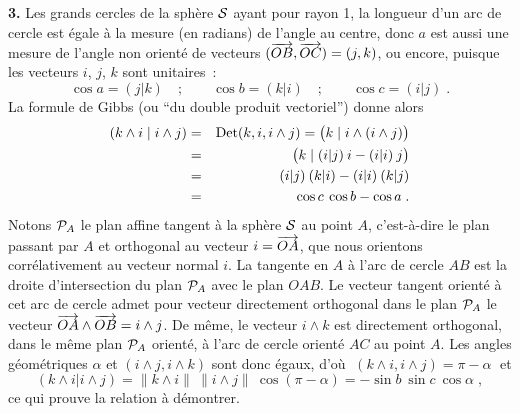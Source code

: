 \documentclass{article}
\begin{document}
{\bf 3.} Les grands cercles de la sph\`ere ${\cal S}$ ayant pour rayon 1, la longueur d'un arc de cercle est \'egale \`a la mesure (en radians) de l'angle au centre, donc $a$ est aussi une mesure de l'angle non orient\'e de vecteurs $(\vect{OB},\vect{OC})=(j,k)$, ou encore, puisque les vecteurs $i$, $j$, $k$ sont unitaires~:\vv
$$\cos a=(j|k)\quad;\qquad \cos b=(k|i)\quad ;\qquad\cos c=(i|j)\;.$$
La formule de Gibbs (ou ``du double produit vectoriel'') donne alors\vv
\begin{eqnarray*}
(k\wedge i\;|\;i\wedge j) & = & \mathop{\rm Det}\nolimits(k,i,i\wedge j)=\big(k\;|\;i\wedge(i\wedge j)\big)\\
& = & \big(k\;|\;(i|j)\>i-(i|i)\>j\big)\\
& = & (i|j)\>(k|i)-(i|i)\>(k|j)\\
& = & \cos c\>\cos b-\cos a\;.
\end{eqnarray*}
\sect
Notons ${\cal P}_A$ le plan affine tangent \`a la sph\`ere ${\cal S}$ au point $A$, c'est-\`a-dire le plan passant par $A$ et orthogonal au vecteur $i=\vect{OA}$, que nous orientons corr\'elativement au vecteur normal $i$. La tangente en $A$ \`a l'arc de cercle $AB$ est la droite d'intersection du plan ${\cal P}_A$ avec le plan $OAB$. Le vecteur tangent orient\'e \`a cet arc de cercle admet pour vecteur directement orthogonal dans le plan ${\cal P}_A$ le vecteur $\vect{OA}\wedge\vect{OB}=i\wedge j$. De m\^eme, le vecteur $i\wedge k$ est directement orthogonal, dans le m\^eme plan ${\cal P}_A$ orient\'e, \`a l'arc de cercle orient\'e $AC$ au point $A$. Les angles g\'eom\'etriques $\alpha$ et $(i\wedge j,i\wedge k)$ sont donc \'egaux, d'o\`u
$\;(k\wedge i,i\wedge j)=\pi-\alpha\;$ et\vv
$$(k\wedge i|i\wedge j)=\|k\wedge i\|\>\|i\wedge j\|\>\cos(\pi-\alpha)=-\sin b\>\sin c\>\cos\alpha\;,$$
ce qui prouve la relation \`a d\'emontrer.
\end{document}
